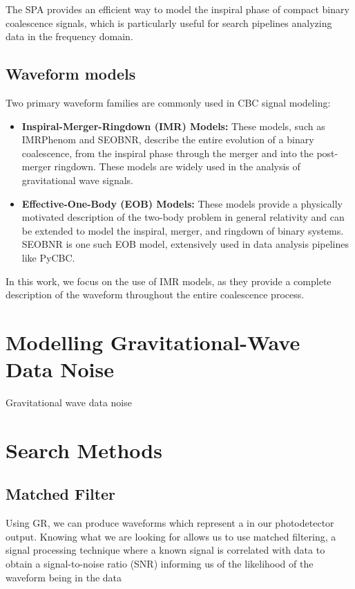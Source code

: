 The SPA provides an efficient way to model the inspiral phase of compact binary coalescence signals, which is particularly useful for search pipelines analyzing data in the frequency domain.


\subsection{Waveform models}

Two primary waveform families are commonly used in CBC signal modeling:
\begin{itemize}
    \item \textbf{Inspiral-Merger-Ringdown (IMR) Models:} These models, such as IMRPhenom and SEOBNR, describe the entire evolution of a binary coalescence, from the inspiral phase through the merger and into the post-merger ringdown. These models are widely used in the analysis of gravitational wave signals.
    \item \textbf{Effective-One-Body (EOB) Models:} These models provide a physically motivated description of the two-body problem in general relativity and can be extended to model the inspiral, merger, and ringdown of binary systems. SEOBNR is one such EOB model, extensively used in data analysis pipelines like PyCBC.
\end{itemize}

In this work, we focus on the use of IMR models, as they provide a complete description of the waveform throughout the entire coalescence process.


\section{\label{2:sec:noise-model}Modelling Gravitational-Wave Data Noise}

Gravitational wave data noise 

\section{\label{2:sec:search-methods}Search Methods}

\subsection{\label{2:sec:matched-filter}Matched Filter}

Using GR, we can produce waveforms which represent a \gw in our photodetector output. Knowing what we are looking for allows us to use matched filtering, a signal processing technique where a known signal is correlated with data to
obtain a signal-to-noise ratio (SNR) informing us of the likelihood of the waveform being in the data

